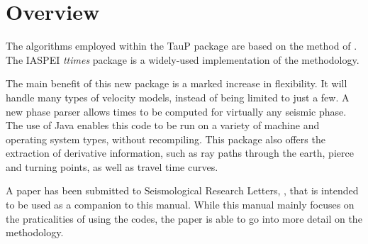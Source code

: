 
\section{Overview}


The algorithms employed within the TauP package are based on the 
method of . 
The IASPEI \textit{ttimes} package is a widely-used implementation of
the methodology.

The main benefit of this new package is a marked increase in flexibility. It
will handle many types of velocity models, instead of being limited to
just a few. A new phase parser allows times to be computed for virtually
any seismic phase. The use of Java enables
this code to be run on a variety of machine and operating system types, 
without recompiling. This package also offers
the extraction of derivative information, such as ray paths through the
earth, pierce and turning points, as well as travel time curves. 

A paper has been submitted to Seismological Research Letters, 
,
that is intended to be used as a companion to this manual. While this manual
mainly focuses on the praticalities of using the codes, 
the paper is able to go into more detail on the methodology.
